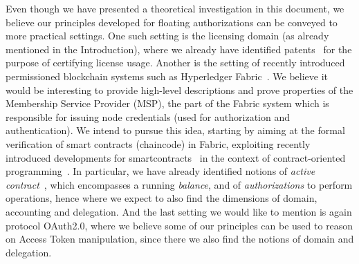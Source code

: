 Even though we have presented a theoretical investigation in this document, we believe our principles developed for floating authorizations can be conveyed to more practical settings. One such setting is the licensing
domain (as already mentioned in the Introduction), where we already have identified patents~\cite{armstrong2005management,baratti2003license,byol} 
for the purpose of certifying license usage. 
Another is the setting of recently introduced permissioned blockchain systems such as Hyperledger Fabric~\cite{eurosys/AndroulakiBBCCC18}. 
We believe it would be interesting to provide high-level descriptions and %
prove properties of the Membership Service Provider (MSP), the part of the Fabric system which is responsible for issuing node credentials (used for authorization and authentication). We intend to pursue this idea, starting by 
aiming at the formal verification of smart contracts (chaincode) in Fabric, exploiting recently introduced developments for smartcontracts~\cite{DBLP:conf/post/AtzeiBCLZ18,DBLP:journals/iacr/BartolettiZ18} in the context of contract-oriented programming~\cite{DBLP:conf/lics/BartolettiZ10}. In particular, we have already identified notions of \emph{active contract}~\cite{DBLP:journals/iacr/BartolettiZ18}, which encompasses a running \emph{balance}, and of \emph{authorizations} to perform operations, 
hence where we expect to also find the dimensions of domain, accounting and delegation.
And the last setting we would like to mention is again protocol OAuth2.0, where we believe some of our principles can be used to reason on Access Token manipulation, since there we also find the notions of domain and  delegation. 